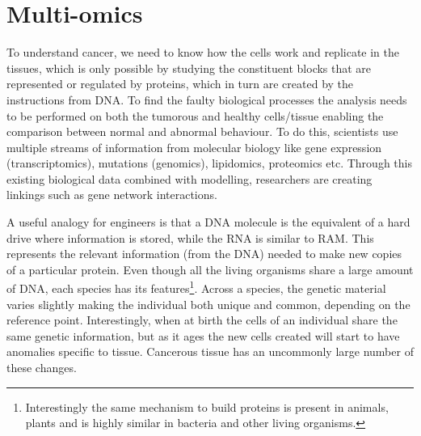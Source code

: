 
\section{Multi-omics} \label{s:multi-omics}


To understand cancer, we need to know how the cells work and replicate in the tissues, which is only possible by studying the constituent blocks that are represented or regulated by proteins, which in turn are created by the instructions from DNA. To find the faulty biological processes the analysis needs to be performed on both the tumorous and healthy cells/tissue enabling the comparison between normal and abnormal behaviour. To do this, scientists use multiple streams of information from molecular biology like gene expression (transcriptomics), mutations (genomics), lipidomics, proteomics etc. Through this existing biological data combined with modelling, researchers are creating linkings such as gene network interactions. 




A useful analogy for engineers is that a DNA molecule is the equivalent of a hard drive where information is stored, while the RNA is similar to RAM. This represents the relevant information (from the DNA) needed to make new copies of a particular protein. Even though all the living organisms share a large amount of DNA, each species has its features\footnote{Interestingly the same mechanism to build proteins is present in animals, plants and is highly similar in bacteria and other living organisms.}. Across a species, the genetic material varies slightly making the individual both unique and common, depending on the reference point. Interestingly, when at birth the cells of an individual share the same genetic information, but as it ages the new cells created will start to have anomalies specific to tissue. Cancerous tissue has an uncommonly large number of these changes.

